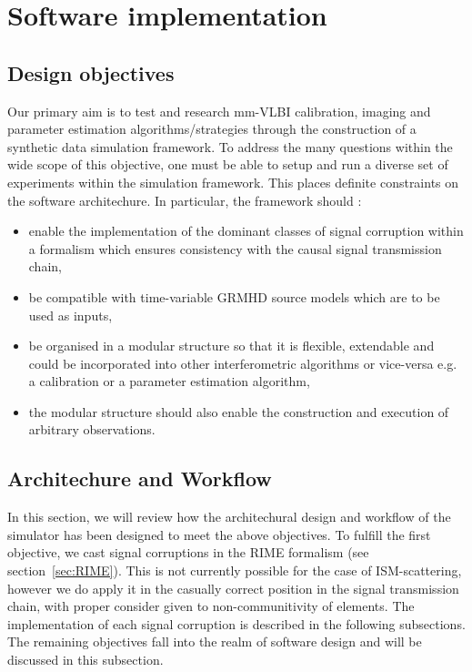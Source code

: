 \chapter{Software implementation}\label{chap:imp}

\section{Design objectives}\label{sec:des_obj}
Our primary aim is to test and research mm-VLBI calibration, imaging and parameter estimation algorithms/strategies through the construction of a synthetic data simulation framework. To address the many questions within the wide scope of this objective, one must be able to setup and run a diverse set of experiments within the simulation framework. This places definite constraints on the software architechure. In particular, the framework should :


\begin{itemize}
 \item enable the implementation of the dominant classes of signal corruption within a formalism which ensures consistency with the causal signal transmission chain,
 \item be compatible with time-variable GRMHD source models which are to be used as inputs,
 \item be organised in a modular structure so that it is flexible, extendable and could be incorporated into other interferometric algorithms or vice-versa e.g. a calibration or a parameter estimation algorithm,
 \item the modular structure should also enable the construction and execution of arbitrary observations.
\end{itemize}

\section{Architechure and Workflow}\label{sec:arch}
In this section, we will review how the architechural design and workflow of the simulator has been designed to meet the above objectives. To fulfill the first objective, we cast signal corruptions in the RIME formalism (see section~\ref{sec:RIME}). This is not currently possible for the case of ISM-scattering, however we do apply it in the casually correct position in the signal transmission chain, with proper consider given to non-communitivity of elements. The implementation of each signal corruption is described in the following subsections. The remaining objectives fall into the realm of software design and will be discussed in this subsection. 


